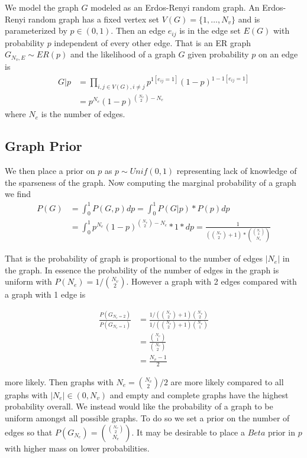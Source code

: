 \documentclass[]{article}
\numberwithin{equation}{section}
\begin{document}
We model the graph \(G\) modeled as an Erdos-Renyi random graph. An
Erdos-Renyi random graph has a fixed vertex set
\(V(G) = \{1, \dots, N_v\}\) and is parameterized by \(p \in (0,1)\).
Then an edge \(e_{ij}\) is in the edge set \(E(G)\) with probability
\(p\) independent of every other edge. That is an ER graph
\(G_{N_v,E} \sim ER(p)\) and the likelihood of a graph \(G\) given
probability \(p\) on an edge is
\[\begin{aligned} G|p & = \prod_{i,j \in V(G),i \neq j} p^{1[e_{ij}=1]}(1-p)^{1-1[e_{ij}=1]} 
\\ & = p^{N_e}(1-p)^{\binom{N_v}{2}-N_e} \end{aligned}\] where \(N_e\)
is the number of edges.

\hypertarget{graph-prior}{%
\subsection{Graph Prior}\label{graph-prior}}

We then place a prior on \(p\) as \(p \sim Unif(0,1)\) representing lack
of knowledge of the sparseness of the graph. Now computing the marginal
probability of a graph we find
\[ \begin{aligned} P(G)  & = \int_0^1  P(G,p)dp   = \int_0^1 P(G|p)*P(p)dp \\ 
&= \int_0^1 p^{N_e}(1-p)^{\binom{N_v}{2}-N_e}*1*dp = \frac{1}{(\binom{N_v}{2}+1)* \binom{\binom{N_v}{2}}{N_e} }  \end{aligned}\]

That is the probability of graph is proportional to the number of edges
\(|N_e|\) in the graph. In essence the probability of the number of
edges in the graph is uniform with \(P(N_e) = 1/\binom{N_v}{2}\).
However a graph with 2 edges compared with a graph with 1 edge is

\[\begin{aligned}\frac{ P(G_{N_e = 2})}{P(G_{N_e = 1})}  &=  \frac{1/(\binom{N_v}{2}+1)\binom{N_v}{2}}{1/(\binom{N_v}{2}+1)\binom{N_v}{1}} \\& = \frac{\binom{N_v}{1}}{\binom{N_v}{2}}  \\& = \frac{N_v-1}{2} \end{aligned}\]

more likely. Then graphs with \(N_e = \binom{N_v}{2}/2\) are more likely
compared to all graphs with \(|N_e| \in (0, N_v)\) and empty and
complete graphs have the highest probability overall. We instead would
like the probability of a graph to be uniform amongst all possible
graphs. To do so we set a prior on the number of edges so that
\(P(G_{N_e}) = \binom{\binom{N_v}{2}}{N_e}\). It may be desirable to
place a \(Beta\) prior in \(p\) with higher mass on lower probabilities.
\end{document}
